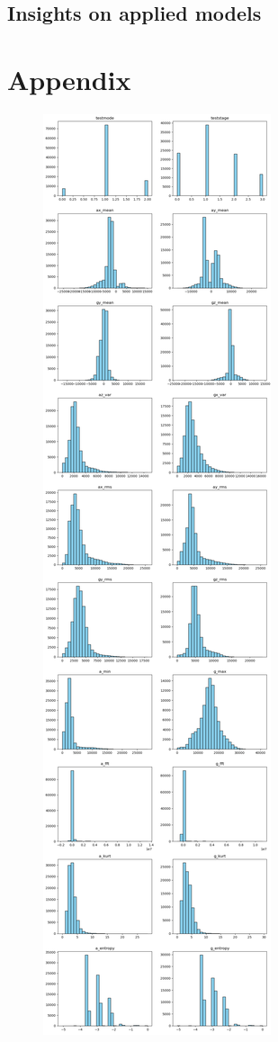 \documentclass[10pt,twocolumn]{article}
\begin{document}
\subsection{Insights on applied models}



\printbibliography

\clearpage  %
\appendix
\section*{Appendix}

\begin{figure}[H]
    \centering
    \includegraphics[width=0.85\linewidth, height=0.9\textheight]{images/distribution_1.png}

\end{figure}
\end{document}
